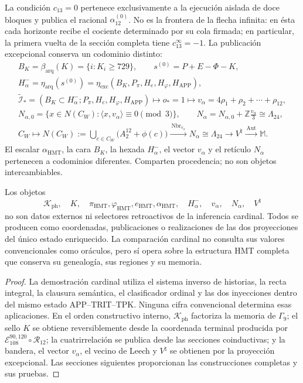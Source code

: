 La condición \(c_{13}=0\) pertenece exclusivamente a la ejecución aislada de
doce bloques y publica el racional \(\alpha_{12}^{(0)}\). No es la frontera
de la flecha infinita: en ésta cada horizonte recibe el cociente determinado
por su cola firmada; en particular, la primera vuelta de la sección completa
tiene \(c_{13}^{\infty}=-1\).
La publicación excepcional conserva un codominio distinto:
\[
 \begin{gathered}
 B_K=\beta_{\mathrm{arq}}(K)=\{i:K_i\ge729\},\qquad
 s^{(0)}=P+E-\Phi-K,\\
 H^-_\alpha=\eta_{\mathrm{arq}}(s^{(0)})
 =\eta_{\mathrm{exc}}(B_K,P_\pi,H_e,H_\varphi,H_{\mathrm{APP}}),\\
 \widetilde{\mathcal I}_*
 =(B_K\subset H^-_\alpha;P_\pi,H_e,H_\varphi,H_{\mathrm{APP}})
 \longmapsto o_*=1
 \longmapsto v_\alpha=4\rho_1+\rho_2+\cdots+\rho_{12},\\
 N_{\alpha,0}
 =\{x\in N(C_W):\langle x,v_\alpha\rangle\equiv0\pmod3\},\qquad
 N_\alpha=N_{\alpha,0}+\mathbb Z\frac{v_\alpha}{3}\cong\Lambda_{24},\\
 C_W\longmapsto
 N(C_W):=\bigcup_{c\in C_W}\bigl(A_2^{12}+\phi(c)\bigr)
 \xrightarrow{\ \operatorname{Nbr}_{v_\alpha}\ }
 N_\alpha\cong\Lambda_{24}
 \longrightarrow V^\natural
 \xrightarrow{\ \operatorname{Aut}\ }\mathbb M.
 \end{gathered}
\]
El escalar \(\alpha_{\mathrm{HMT}}\), la cara \(B_K\), la hexada
\(H^-_\alpha\), el vector \(v_\alpha\) y el retículo \(N_\alpha\) pertenecen
a codominios diferentes. Comparten procedencia; no son objetos intercambiables.

\begin{proposition}
\label{prop:posterioridad-testigos-ch}
Los objetos
\[
 \mathcal K_{\mathrm{ph}},\quad K,\quad
 \pi_{\mathrm{HMT}},\varphi_{\mathrm{HMT}},e_{\mathrm{HMT}},
 \alpha_{\mathrm{HMT}},\quad H^-_\alpha,\quad v_\alpha,\quad
 N_\alpha,\quad V^\natural
\]
no son datos externos ni selectores retroactivos de la inferencia cardinal.
Todos se producen como coordenadas, publicaciones o realizaciones de las dos
proyecciones del único estado enriquecido. La comparación cardinal no consulta
sus valores convencionales como oráculos, pero sí opera sobre la estructura
HMT completa que conserva su genealogía, sus regiones y su memoria.
\end{proposition}

\begin{proof}
La demostración cardinal utiliza el sistema inverso de historias, la recta
integral, la clausura semántica, el clasificador ordinal y las dos inyecciones
dentro del mismo estado APP--TRIT--TPK. Ninguna cifra convencional determina
esas aplicaciones. En el orden constructivo interno,
\(\mathcal K_{\mathrm{ph}}\) factoriza la memoria de \(\Gamma_9\); el sello
\(K\) se obtiene reversiblemente desde la coordenada terminal producida por
\(\mathcal E_{108}^{90,120}\circ\mathcal R_{12}\); la
cuatrirrelación se publica desde las secciones coinductivas; y la bandera, el
vector \(v_\alpha\), el vecino de Leech y \(V^\natural\) se obtienen por la
proyección excepcional. Las secciones siguientes proporcionan las
construcciones completas y sus pruebas.
\end{proof}

